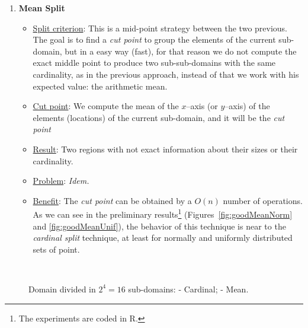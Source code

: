 \begin{enumerate}
\item {\bf Mean Split}
\begin{itemize}
\item \underline{Split criterion}: This is a mid-point strategy between the two previous. The goal is to find a {\it cut point} to group the elements of the current sub-domain, but in a easy way (fast), for that reason we do not compute the exact middle point to produce two sub-sub-domains with the same cardinality, as in the previous approach, instead of that we work with his expected value: the arithmetic mean.
\item \underline{Cut point}: We compute the mean of the $x$--axis (or $y$--axis) of the elements (locations) of the current sub-domain, and it will be the {\it cut point}
\item \underline{Result}: Two regions with not exact information about their sizes or their cardinality.
\item \underline{Problem}: {\it Idem.}
\item \underline{Benefit}: The {\it cut point} can be obtained by a $O(n)$ number of operations. As we can see in the preliminary results\footnote{The experiments are coded in R\cite{Paradis2005}.} (Figures~\ref{fig:goodMeanNorm} and \ref{fig:goodMeanUnif}), the behavior of this technique is near to the {\it cardinal split} technique, at least for normally and uniformly distributed sets of point.
\end{itemize}
\end{enumerate}

\begin{figure}
	\centering
	\hspace{3pt}%
	\\
	\hspace{3pt}%
	\caption[]{Domain divided in $2^4 = 16$ sub-domains:
		 -
		 Cardinal;
		 -	
		 Mean.}%
	\label{fig:goodCard}
\end{figure}

